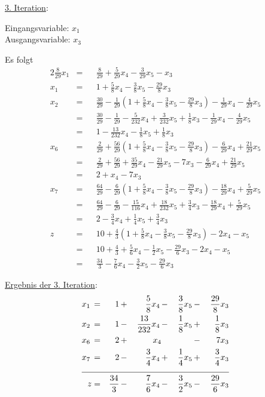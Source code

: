 \documentclass[10pt,a4paper,oneside,ngerman,numbers=noenddot]{scrartcl}
\begin{document}
		\underline{3. Iteration}:
		
		Eingangsvariable: $x_{1}$\\
		Ausgangsvariable: $x_{3}$
		
		Es folgt
		\begin{alignat*}{2}
			\frac{8}{29}x_{1} &=&& \frac{8}{29} + \frac{5}{29}x_{4} - \frac{3}{29}x_{5} - x_{3} \\
			x_{1} &=&& 1 + \frac{5}{8}x_{4} - \frac{3}{8}x_{5} - \frac{29}{8}x_{3} \\
			x_{2} &=&& \frac{30}{29} - \frac{1}{29}\left(1 + \frac{5}{8}x_{4} - \frac{3}{8}x_{5} - \frac{29}{8}x_{3}\right) - \frac{1}{29}x_{4} - \frac{4}{29}x_{5} \\
			&=&& \frac{30}{29} - \frac{1}{29} - \frac{5}{232}x_{4} +  \frac{3}{232}x_{5} + \frac{1}{8}x_{3} - \frac{1}{29}x_{4} - \frac{4}{29}x_{5} \\
			&=&& 1 - \frac{13}{232}x_{4} - \frac{1}{8}x_{5} + \frac{1}{8}x_{3} \\
			x_{6} &=&& \frac{2}{29} + \frac{56}{29}\left(1 + \frac{5}{8}x_{4} - \frac{3}{8}x_{5} - \frac{29}{8}x_{3}\right) - \frac{6}{29}x_{4} + \frac{21}{29}x_{5} \\
			&=&& \frac{2}{29} + \frac{56}{29} + \frac{35}{29}x_{4} - \frac{21}{29}x_{5} - 7x_{3} - \frac{6}{29}x_{4} + \frac{21}{29}x_{5} \\
			&=&& 2 + x_{4} - 7x_{3} \\
			x_{7} &=&& \frac{64}{29} - \frac{6}{29}\left(1 + \frac{5}{8}x_{4} - \frac{3}{8}x_{5} - \frac{29}{8}x_{3}\right) - \frac{18}{29}x_{4} + \frac{5}{29}x_{5} \\
			&=&& \frac{64}{29} - \frac{6}{29} - \frac{15}{116}x_{4} + \frac{18}{232}x_{5} + \frac{3}{4}x_{3} - \frac{18}{29}x_{4} + \frac{5}{29}x_{5} \\
			&=&& 2 - \frac{3}{4}x_{4} + \frac{1}{4}x_{5} + \frac{3}{4}x_{3} \\
			z &=&& 10 + \frac{4}{3}\left(1 + \frac{5}{8}x_{4} - \frac{3}{8}x_{5} - \frac{29}{8}x_{3}\right) - 2x_{4} - x_{5} \\
			&=&& 10 + \frac{4}{3} + \frac{5}{6}x_{4} - \frac{1}{2}x_{5} - \frac{29}{6}x_{3} - 2x_{4} - x_{5} \\
			&=&& \frac{34}{3} - \frac{7}{6}x_{4} - \frac{3}{2}x_{5} - \frac{29}{6}x_{3}
		\end{alignat*}
		
		\underline{Ergebnis der 3. Iteration}:
		\begin{alignat*}{5}
			x_{1} \,&=&\, 1 \,&+&\, \frac{5}{8}x_{4} \,&-&\, \frac{3}{8}x_{5} \,&-&\, \frac{29}{8}x_{3} \\
			x_{2} \,&=&\, 1 \,&-&\, \frac{13}{232}x_{4} \,&-&\, \frac{1}{8}x_{5} \,&+&\, \frac{1}{8}x_{3} \\
			x_{6} \,&=&\, 2 \,&+&\, x_{4} && \,&-&\, 7x_{3} \\
			x_{7} \,&=&\, 2 \,&-&\, \frac{3}{4}x_{4} \,&+&\, \frac{1}{4}x_{5} \,&+&\, \frac{3}{4}x_{3} \\ \cline{1 - 9}
			z &=& \frac{34}{3} \,&-&\, \frac{7}{6}x_{4} \,&-&\, \frac{3}{2}x_{5} \,&-&\, \frac{29}{6}x_{3}
		\end{alignat*}
		
\end{document}
